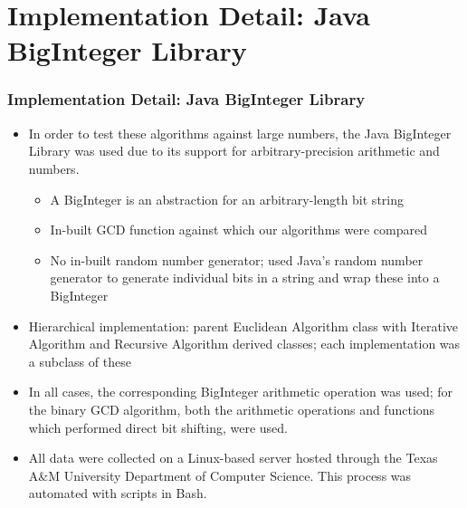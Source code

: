 \documentclass{beamer}
\begin{document}
\section{Implementation Detail: Java BigInteger Library}
\begin{frame}
\frametitle{Implementation Detail: Java BigInteger Library}
\footnotesize
\begin{itemize} 
\item In order to test these algorithms against large numbers, the Java BigInteger Library was used due to its support for arbitrary-precision arithmetic and numbers.
	\begin{itemize}
	\footnotesize
	\item A BigInteger is an abstraction for an arbitrary-length bit string
	\item In-built GCD function against which our algorithms were compared
	\item No in-built random number generator; used Java's random number 	generator to generate individual bits in a string and wrap these into a 	BigInteger
	\end{itemize}
\item Hierarchical implementation: parent Euclidean Algorithm class with Iterative Algorithm and Recursive Algorithm derived classes; each implementation was a subclass of these
\item In all cases, the corresponding BigInteger arithmetic operation was used; for the binary GCD algorithm, both the arithmetic operations and functions which performed direct bit shifting, were used.
\item All data were collected on a Linux-based server hosted through the Texas A\&M University Department of Computer Science. This process was automated with scripts in Bash.
\end{itemize}
\end{frame}
\end{document}
